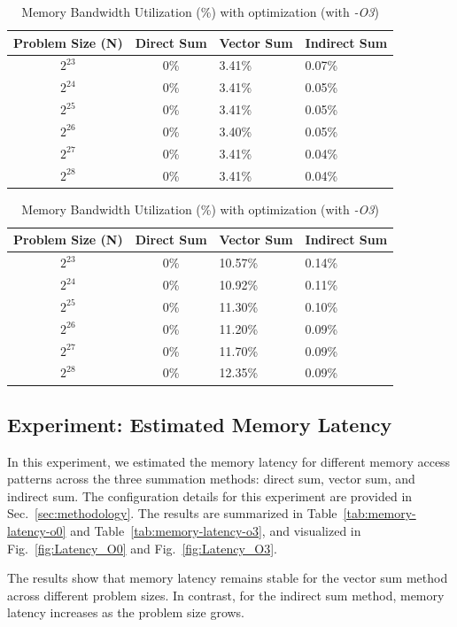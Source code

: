 \begin{table}[htbp]
    \centering\small
    \begin{tabular}{c|cll}
 Problem Size (N) & Direct Sum & Vector Sum & Indirect Sum \\ \hline
 $2^{23}$ & 0\%& 3.41\%&0.07\%\\
 $2^{24}$ & 0\%& 3.41\%&0.05\%\\
 $2^{25}$ & 0\%& 3.41\%&0.05\%\\
 $2^{26}$ & 0\%& 3.40\%&0.05\%\\
 $2^{27}$ & 0\%& 3.41\%&0.04\%\\
 $2^{28}$ & 0\%& 3.41\%&0.04\%\\ 
    \end{tabular}
    \caption{Memory Bandwidth Utilization (\%) without optimization (with \textit{-O0})}
    \label{tab:memory-bandwidth-o0}
    \begin{tabular}{c|cll}
 Problem Size (N) & Direct Sum & Vector Sum & Indirect Sum \\ \hline
 $2^{23}$ & 0\%& 10.57\%&0.14\%\\
 $2^{24}$ & 0\%& 10.92\%&0.11\%\\
 $2^{25}$ & 0\%& 11.30\%&0.10\%\\
 $2^{26}$ & 0\%& 11.20\%&0.09\%\\
 $2^{27}$ & 0\%& 11.70\%&0.09\%\\
 $2^{28}$ & 0\%& 12.35\%&0.09\%\\ 
    \end{tabular}
    \caption{Memory Bandwidth Utilization (\%) with optimization (with \textit{-O3})}
    \label{tab:memory-bandwidth-o3}
\end{table}

\subsection{Experiment: Estimated Memory Latency}
In this experiment, we estimated the memory latency for different memory access patterns across the three summation methods: direct sum, vector sum, and indirect sum. The configuration details for this experiment are provided in Sec.~\ref{sec:methodology}. The results are summarized in Table~\ref{tab:memory-latency-o0} and Table~\ref{tab:memory-latency-o3}, and visualized in Fig.~\ref{fig:Latency_O0} and Fig.~\ref{fig:Latency_O3}.

The results show that memory latency remains stable for the vector sum method across different problem sizes. In contrast, for the indirect sum method, memory latency increases as the problem size grows.

